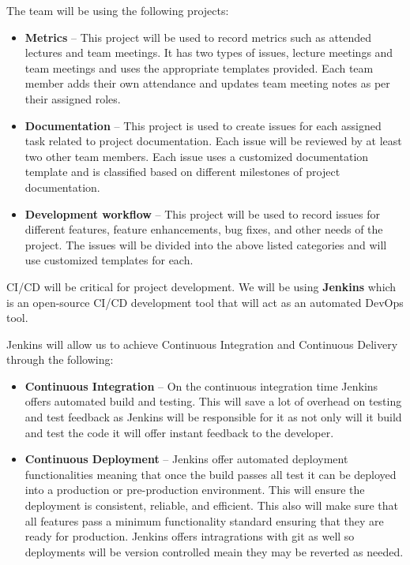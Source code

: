 \documentclass{article}
\begin{document}
The team will be using the following projects:

\begin{itemize}
\item \textbf{Metrics} -- This project will be used to record metrics such as attended lectures and team meetings. It has two types of issues, lecture meetings and team meetings and uses the appropriate templates provided. Each team member adds their own attendance and updates team meeting notes as per their assigned roles.
\item \textbf{Documentation} -- This project is used to create issues for each assigned task related to project documentation. Each issue will be reviewed by at least two other team members. Each issue uses a customized documentation template and is classified based on different milestones of project documentation. 
\item \textbf{Development workflow} -- This project will be used to record issues for different features, feature enhancements, bug fixes, and other needs of the project. The issues will be divided into the above listed categories and will use customized templates for each. 
\end{itemize}

CI/CD will be critical for project development. We will be using \textbf{Jenkins} which is an open-source CI/CD development tool that will act as an automated DevOps tool.

Jenkins will allow us to achieve Continuous Integration and Continuous Delivery through the following:
\begin{itemize}
  \item \textbf{Continuous Integration} -- On the continuous integration time Jenkins offers automated build and testing. This will save a lot of overhead on testing and test feedback as Jenkins will be responsible for it as not only will it build and test the code it will offer instant feedback to the developer.
  \item \textbf{Continuous Deployment} -- Jenkins offer automated deployment functionalities meaning that once the build passes all test it can be deployed into a production or pre-production environment. This will ensure the deployment is consistent, reliable, and efficient. This also will make sure that all features pass a minimum functionality standard ensuring that they are ready for production. Jenkins offers intragrations with git as well so deployments will be version controlled meain they may be reverted as needed.
\end{itemize}
\end{document}
